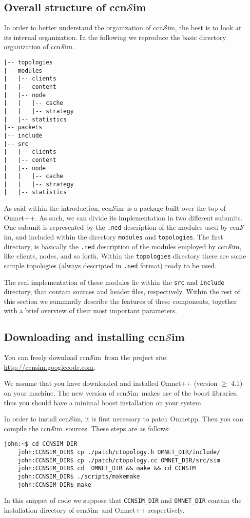 \documentclass{article}
\newcommand{\ccnsim}{ccn$\mathcal{S}$im}
\begin{document}
\subsection{Overall structure of \ccnsim}
In order to better understand the organization of \ccnsim, the best is to look at its internal organization. In the following we reproduce the basic directory organization of \ccnsim. 
\begin{Verbatim}[frame=single]
|-- topologies
|-- modules
|   |-- clients
|   |-- content
|   |-- node
|   |   |-- cache
|   |   |-- strategy
|   |-- statistics
|-- packets
|-- include
|-- src
|   |-- clients
|   |-- content
|   |-- node
|   |   |-- cache
|   |   |-- strategy
|   |-- statistics
\end{Verbatim}
As said within the introduction, \ccnsim\ is a package built over the top of Omnet++. As such, we can divide its implementation in two different subunits. One subunit is represented by the \verb|.ned| description of the modules used by \ccnsim, and included within the directory \verb|modules| and \verb|topologies|. The first directory, is basically the \verb|.ned| description of the modules employed by \ccnsim, like clients, nodes, and so forth. Within the \verb|topologies| directory there are some sample topologies (always descripted in \verb|.ned| format) ready to be used. 

The real implementation of these modules lie within the \verb|src| and \verb|include| directory, that contain sources and header files, respectively.  Within the rest of this section we summarily  describe the features of these components, together with a brief overview of their most important parameters.

\subsection{Downloading and installing \ccnsim}
You can freely download \ccnsim\ from the project site: \url{http://ccnsim.googlecode.com}. 

We assume that you have downloaded and installed Omnet++ (version $\geq$ 4.1) on your machine. The new version of \ccnsim\ makes use of the boost libraries, thus you should have a minimal boost installation on your system. 

In order to install \ccnsim, it is first necessary to patch Omnetpp. Then you can compile the \ccnsim\ sources. These steps are as follows:

\begin{Verbatim}[frame=single]
    john:~$ cd CCNSIM_DIR
    john:CCNSIM_DIR$ cp ./patch/ctopology.h OMNET_DIR/include/
    john:CCNSIM_DIR$ cp ./patch/ctopology.cc OMNET_DIR/src/sim
    john:CCNSIM_DIR$ cd  OMNET_DIR && make && cd CCNSIM
    john:CCNSIM_DIR$ ./scripts/makemake
    john:CCNSIM_DIR$ make
\end{Verbatim}
In this snippet of code we suppose that \verb|CCNSIM_DIR| and \verb|OMNET_DIR| contain the installation directory of \ccnsim\ and Omnet++ respectively. 
\end{document}
